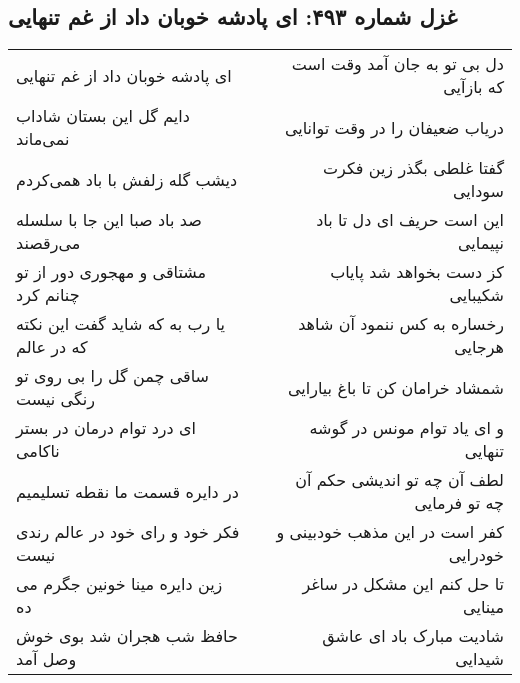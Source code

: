 \begin{center}
\section*{غزل شماره ۴۹۳: ای پادشه خوبان داد از غم تنهایی}
\label{sec:sh493}
\begin{longtable}{l p{0.5cm} r}
ای پادشه خوبان داد از غم تنهایی
&&
دل بی تو به جان آمد وقت است که بازآیی
\\
دایم گل این بستان شاداب نمی‌ماند
&&
دریاب ضعیفان را در وقت توانایی
\\
دیشب گله زلفش با باد همی‌کردم
&&
گفتا غلطی بگذر زین فکرت سودایی
\\
صد باد صبا این جا با سلسله می‌رقصند
&&
این است حریف ای دل تا باد نپیمایی
\\
مشتاقی و مهجوری دور از تو چنانم کرد
&&
کز دست بخواهد شد پایاب شکیبایی
\\
یا رب به که شاید گفت این نکته که در عالم
&&
رخساره به کس ننمود آن شاهد هرجایی
\\
ساقی چمن گل را بی روی تو رنگی نیست
&&
شمشاد خرامان کن تا باغ بیارایی
\\
ای درد توام درمان در بستر ناکامی
&&
و ای یاد توام مونس در گوشه تنهایی
\\
در دایره قسمت ما نقطه تسلیمیم
&&
لطف آن چه تو اندیشی حکم آن چه تو فرمایی
\\
فکر خود و رای خود در عالم رندی نیست
&&
کفر است در این مذهب خودبینی و خودرایی
\\
زین دایره مینا خونین جگرم می ده
&&
تا حل کنم این مشکل در ساغر مینایی
\\
حافظ شب هجران شد بوی خوش وصل آمد
&&
شادیت مبارک باد ای عاشق شیدایی
\\
\end{longtable}
\end{center}
